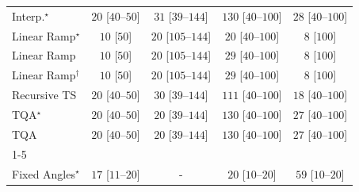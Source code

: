 \begin{tabular}{l|cccc|}
Interp.$^\star$ & {\cellcolor[HTML]{F5FBF2}} \color[HTML]{000000} $20$ [$40$--$50$] & {\cellcolor[HTML]{F3FAF0}} \color[HTML]{000000} $31$ [$39$--$144$] & {\cellcolor[HTML]{DDF2D8}} \color[HTML]{000000} $130$ [$40$--$100$] & {\cellcolor[HTML]{F4FBF1}} \color[HTML]{000000} $28$ [$40$--$100$] \\
Linear Ramp$^\star$ & {\cellcolor[HTML]{F7FCF5}} \color[HTML]{000000} $10$ [$50$] & {\cellcolor[HTML]{F5FBF2}} \color[HTML]{000000} $20$ [$105$--$144$] & {\cellcolor[HTML]{F5FBF2}} \color[HTML]{000000} $20$ [$40$--$100$] & {\cellcolor[HTML]{F7FCF5}} \color[HTML]{000000} $8$ [$100$] \\
Linear Ramp & {\cellcolor[HTML]{F7FCF5}} \color[HTML]{000000} $10$ [$50$] & {\cellcolor[HTML]{F5FBF2}} \color[HTML]{000000} $20$ [$105$--$144$] & {\cellcolor[HTML]{F3FAF0}} \color[HTML]{000000} $29$ [$40$--$100$] & {\cellcolor[HTML]{F7FCF5}} \color[HTML]{000000} $8$ [$100$] \\
Linear Ramp$^\dagger$ & {\cellcolor[HTML]{F7FCF5}} \color[HTML]{000000} $10$ [$50$] & {\cellcolor[HTML]{F5FBF2}} \color[HTML]{000000} $20$ [$105$--$144$] & {\cellcolor[HTML]{F3FAF0}} \color[HTML]{000000} $29$ [$40$--$100$] & {\cellcolor[HTML]{F7FCF5}} \color[HTML]{000000} $8$ [$100$] \\
Recursive TS & {\cellcolor[HTML]{F5FBF2}} \color[HTML]{000000} $20$ [$40$--$50$] & {\cellcolor[HTML]{F3FAF0}} \color[HTML]{000000} $30$ [$39$--$144$] & {\cellcolor[HTML]{E3F4DE}} \color[HTML]{000000} $111$ [$40$--$100$] & {\cellcolor[HTML]{F5FBF3}} \color[HTML]{000000} $18$ [$40$--$100$] \\
TQA$^\star$ & {\cellcolor[HTML]{F5FBF2}} \color[HTML]{000000} $20$ [$40$--$50$] & {\cellcolor[HTML]{F5FBF2}} \color[HTML]{000000} $20$ [$39$--$144$] & {\cellcolor[HTML]{DDF2D8}} \color[HTML]{000000} $130$ [$40$--$100$] & {\cellcolor[HTML]{F4FBF1}} \color[HTML]{000000} $27$ [$40$--$100$] \\
TQA & {\cellcolor[HTML]{F5FBF2}} \color[HTML]{000000} $20$ [$40$--$50$] & {\cellcolor[HTML]{F5FBF2}} \color[HTML]{000000} $20$ [$39$--$144$] & {\cellcolor[HTML]{DDF2D8}} \color[HTML]{000000} $130$ [$40$--$100$] & {\cellcolor[HTML]{F4FBF1}} \color[HTML]{000000} $27$ [$40$--$100$] \\
\cline{1-5}
\multicolumn{5}{c}{\rule{0pt}{8pt}SV} \\
\midrule
Fixed Angles$^\star$ & {\cellcolor[HTML]{F5FBF3}} \color[HTML]{000000} $17$ [$11$--$20$] & {\cellcolor[HTML]{000000}} \color[HTML]{F1F1F1} {\cellcolor{white}} \color{black} - & {\cellcolor[HTML]{F5FBF2}} \color[HTML]{000000} $20$ [$10$--$20$] & {\cellcolor[HTML]{EDF8EA}} \color[HTML]{000000} $59$ [$10$--$20$] \\

\end{tabular}
